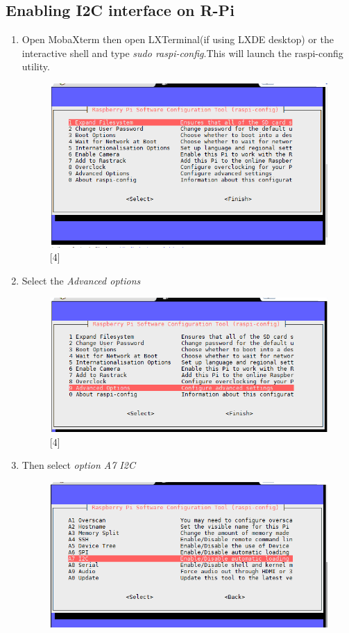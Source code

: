 \documentclass[11pt,a4paper]{article}
\begin{document}
	\subsection{Enabling I2C interface on R-Pi}
	\begin{enumerate}
		\item Open MobaXterm then open LXTerminal(if using LXDE desktop) or the interactive shell and type \textit{sudo raspi-config}.This will launch the raspi-config utility.
		\begin{figure}[h!]
			\includegraphics[width=11cm]{i2c_1.png}
			\centering
			\caption{[4]}
			\end{figure}
		\item Select the \textit{Advanced options}
		\begin{figure}[h!]
			\includegraphics[width=11cm]{i2c_2.png}
			\centering
			\caption{[4]}
		\end{figure} 
		\item Then select \textit{option A7 I2C} 
		\begin{figure}[h!]
			\includegraphics[scale=0.6]{i2c_3.png}

\end{figure}
\end{enumerate}
\end{document}
